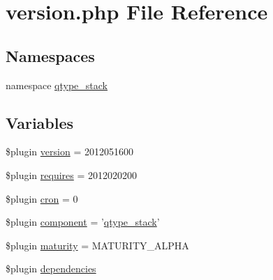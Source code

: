 \hypertarget{version_8php}{
\section{version.php File Reference}
\label{version_8php}
}
\subsection*{Namespaces}
\begin{DoxyCompactItemize}
\item 
namespace \hyperlink{namespaceqtype__stack}{qtype\_\-stack}
\end{DoxyCompactItemize}
\subsection*{Variables}
\begin{DoxyCompactItemize}
\item 
\$plugin \hyperlink{version_8php_a92a3fd99b37c9cbd65c4aead816b3a83}{version} = 2012051600
\item 
\$plugin \hyperlink{version_8php_a9c9f657b2cd3e37b286e8b1f70d99bda}{requires} = 2012020200
\item 
\$plugin \hyperlink{version_8php_ac5be73ff43d202617c9da25568c37ef5}{cron} = 0
\item 
\$plugin \hyperlink{version_8php_a27dc7e2c13f48a05e56e0d3138fe3c82}{component} = '\hyperlink{classqtype__stack}{qtype\_\-stack}'
\item 
\$plugin \hyperlink{version_8php_a32ceacc498b265853073aba2281015e5}{maturity} = MATURITY\_\-ALPHA
\item 
\$plugin \hyperlink{version_8php_a816e85fbd31aa493f1f3c61082b10b1a}{dependencies}
\end{DoxyCompactItemize}


